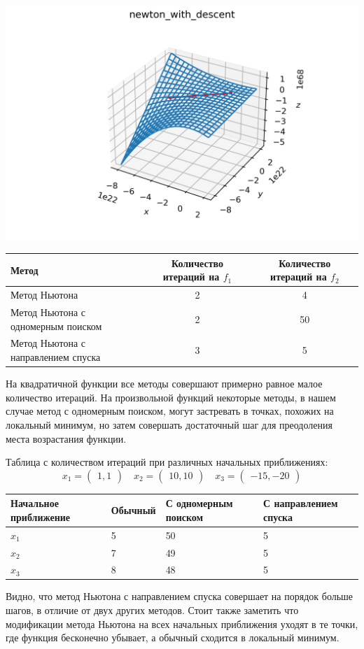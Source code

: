 \documentclass[english]{article}
\begin{document}
\begin{enumerate}
\begin{center}
    \includegraphics[scale=0.7]{plots/3D_newton_with_descent_2.png}
  \end{center}
\end{enumerate}
\begin{center}
  \begin{longtable}{l|cc}
    Метод & Количество итераций на \(f_1\) & Количество итераций на \(f_2\) \\
    \hline
    Метод Ньютона & 2 & 4 \\
    \hline
    Метод Ньютона с одномерным поиском & 2 & 50 \\
    \hline
    Метод Ньютона с направлением спуска & 3 & 5 \\
  \end{longtable}
\end{center}
На квадратичной функции все методы совершают примерно равное малое
количество итераций. На произвольной функций некоторые методы, в нашем
случае метод с одномерным поиском, могут застревать в точках, похожих
на локальный минимум, но затем совершать достаточный шаг для
преодоления места возрастания функции.


Таблица с количеством итераций при различных начальных приближениях:
\[ x_1 = \begin{pmatrix}
  1, 1
\end{pmatrix} \quad x_2 = \begin{pmatrix}
  10, 10
\end{pmatrix} \quad x_3 = \begin{pmatrix}
  -15, -20
\end{pmatrix}\]
\begin{center}
  \begin{longtable}{l|l|l|l}
    Начальное приближение & Обычный & С одномерным поиском & С направлением спуска \\
    \hline
    \(x_1\) & 5 & 50 & 5 \\
    \hline
    \(x_2\) & 7 & 49 & 5 \\
    \hline
    \(x_3\) & 8 & 48 & 5 \\
  \end{longtable}
\end{center}
Видно, что метод Ньютона с направлением спуска совершает на порядок
больше шагов, в отличие от двух других методов. Стоит также заметить
что модификации метода Ньютона на всех начальных приближения уходят в
те точки, где функция бесконечно убывает, а обычный сходится в
локальный минимум.
\end{document}
